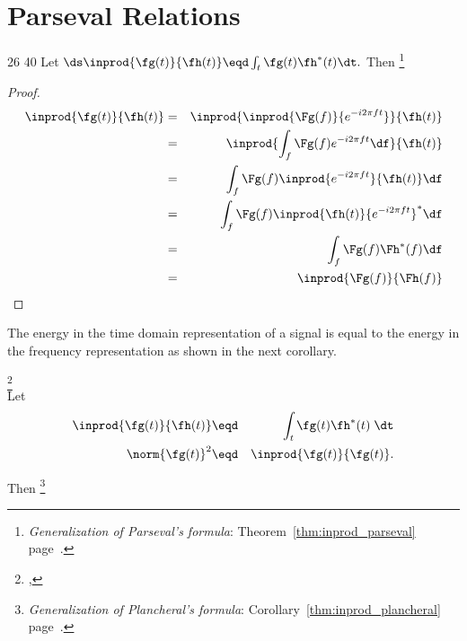 \section{Parseval Relations}
\label{sec:parseval}
\begin{theorem}
\citep{mallat}{26}
\citep{goswami}{40}
\label{thm:GPT}
Let $\ds \inprod{\fg(t)}{\fh(t)} \eqd \int_t \fg(t) \fh^\ast(t) \dt.$
Then 
\footnote{
  {\em Generalization of Parseval's formula}: 
  Theorem~\ref{thm:inprod_parseval} page~\pageref{thm:inprod_parseval}.
  }
\end{theorem}

\begin{proof}
\begin{eqnarray*}
   \inprod{\fg(t)}{\fh(t)}
     &=&    \inprod{\inprod{\Fg(f)}{e^{-i2\pi ft}}}{\fh(t)}
   \\&=&    \inprod{\int_f\Fg(f)e^{-i2\pi ft}\df}{\fh(t)}
   \\&=&    \int_f\Fg(f) \inprod{e^{-i2\pi ft}}{\fh(t)} \df
   \\&=&    \int_f\Fg(f) \inprod{\fh(t)}{e^{-i2\pi ft}}^\ast \df
   \\&=&    \int_f\Fg(f) \Fh^\ast(f) \df
   \\&=&    \inprod{\Fg(f)}{\Fh(f)}
\end{eqnarray*}
\end{proof}

The energy in the time domain representation of a signal 
is equal to the energy in 
the frequency representation as shown in the next corollary.
\begin{corollary}
\footnote{
  ,
  }
\label{cor:plancheral}\\
Let
\begin{eqnarray*}
   \inprod{\fg(t)}{\fh(t)} &\eqd& \int_t \fg(t) \fh^\ast(t) \; \dt \\
   \norm{\fg(t)}^2 &\eqd& \inprod{\fg(t)}{\fg(t)}.
\end{eqnarray*}

Then
\footnote{
  {\em Generalization of Plancheral's formula}: 
  Corollary~\ref{thm:inprod_plancheral} page~\pageref{thm:inprod_plancheral}.
  }
\end{corollary}

